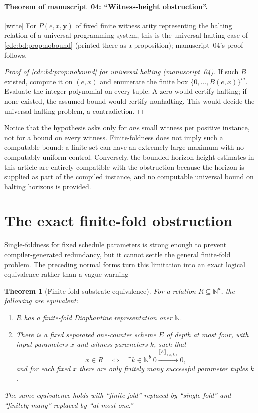 \documentclass[11pt,a4paper]{article}
\newtheorem{theorem}{Theorem}[section]
\theoremstyle{definition}
\theoremstyle{remark}
\newcommand{\N}{\mathbb N}
\newcommand{\wtag}{\textup{[write]}}%
\newcommand{\srctag}[1]{\texorpdfstring{\hspace{0.5em}{\normalfont\small\color{accent}[#1]}}{ [#1]}}
\begin{document}
\paragraph{Theorem of manuscript~04: ``Witness-height obstruction''.} \wtag{} For $P(e,x,\mathbf y)$ of fixed finite witness arity representing the halting relation of a universal programming system, this is the universal-halting case of \cref{cdc:bd:prop:nobound} (printed there as a proposition); manuscript~04's proof follows.

\begin{proof}[Proof of \cref{cdc:bd:prop:nobound} for universal halting (manuscript~04)]
If such $B$ existed, compute it on $(e,x)$ and enumerate the finite box $\{0,\ldots,B(e,x)\}^m$. Evaluate the integer polynomial on every tuple. A zero would certify halting; if none existed, the assumed bound would certify nonhalting. This would decide the universal halting problem, a contradiction.
\end{proof}

Notice that the hypothesis asks only for \emph{one} small witness per positive instance, not for a bound on every witness. Finite-foldness does not imply such a computable bound: a finite set can have an extremely large maximum with no computably uniform control. Conversely, the bounded-horizon height estimates in this article are entirely compatible with the obstruction because the horizon is supplied as part of the compiled instance, and no computable universal bound on halting horizons is provided.


\section{The exact finite-fold obstruction\srctag{06}}
\label{cdc:cs:sec:finitefold}

Single-foldness for fixed schedule parameters is strong enough to prevent
compiler-generated redundancy, but it cannot settle the general finite-fold
problem. The preceding normal forms turn this limitation into an exact
logical equivalence rather than a vague warning.

\begin{theorem}[Finite-fold substrate equivalence]
\label{cdc:cs:thm:finitefold}
For a relation $R\subseteq\N^a$, the following are equivalent:
\begin{enumerate}[label=\textnormal{(\roman*)},leftmargin=2em]
\item $R$ has a finite-fold Diophantine representation over $\N$.
\item There is a fixed separated one-counter scheme $E$ of depth at most four,
with input parameters $x$ and witness parameters $k$, such that
\[
x\in R\quad\Longleftrightarrow\quad
\exists k\in\N^b\;0\xrightarrow{\llbracket E\rrbracket_{(x,k)}}0,
\]
and for each fixed $x$ there are only finitely many successful parameter
tuples $k$.
\end{enumerate}
The same equivalence holds with ``finite-fold'' replaced by ``single-fold''
and ``finitely many'' replaced by ``at most one.''
\end{theorem}
\end{document}
